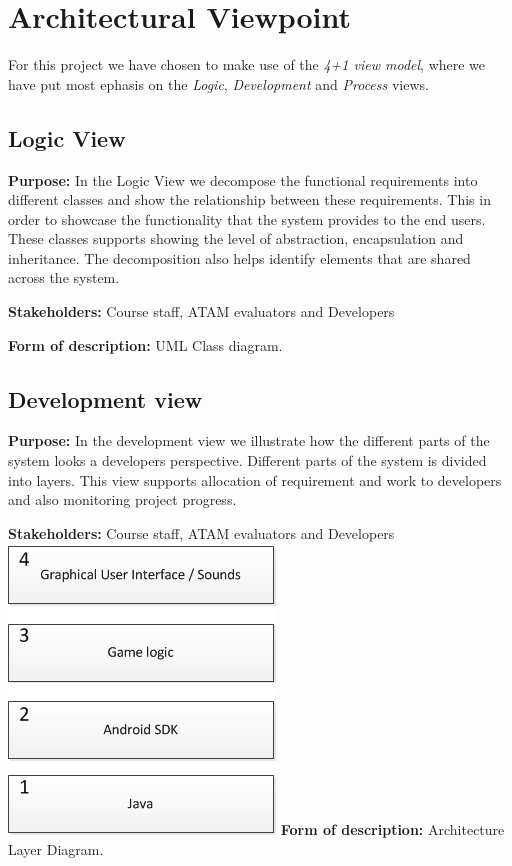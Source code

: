 \chapter{Architectural Viewpoint}
For this project we have chosen to make use of the \emph{4+1 view model}, where we have put most ephasis on the \emph{Logic}, \emph{Development} and \emph{Process} views.

    \section{Logic View}
    \textbf{Purpose:} In the Logic View we decompose the functional requirements into different classes and show the relationship between these requirements. This in order to showcase the functionality that the system provides to the end users.
    These classes supports showing the level of abstraction, encapsulation and inheritance.%
    The decomposition also helps identify elements that are shared across the system. 
    
    \noindent\textbf{Stakeholders:} Course staff, ATAM evaluators and Developers 
    
    \noindent\textbf{Form of description:} UML Class diagram.
    
    \section{Development view}
    \textbf{Purpose:} In the development view we illustrate how the different parts of the system looks a developers perspective. Different parts of the system is divided into layers. This view supports allocation of requirement
    and work to developers and also monitoring project progress.  
    
    \noindent\textbf{Stakeholders:} Course staff, ATAM evaluators and Developers
    \includegraphics{DevelopmentView.png}
    \noindent\textbf{Form of description:} Architecture Layer Diagram. 
    
